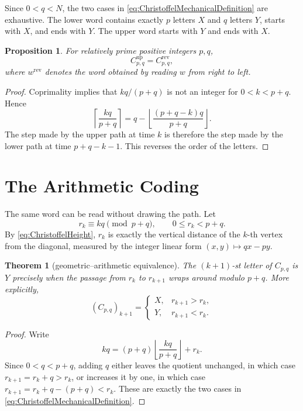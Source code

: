 \documentclass{book}
\newtheorem{proposition}[definition]{Proposition}
\newtheorem{theorem}[definition]{Theorem}
\begin{document}
Since \(0<q<N\), the two cases in
\eqref{eq:ChristoffelMechanicalDefinition} are exhaustive.  The lower
word contains exactly \(p\) letters \(X\) and \(q\) letters \(Y\), starts
with \(X\), and ends with \(Y\).  The upper word starts with \(Y\) and
ends with \(X\).

\begin{proposition}\label{proposition:ChristoffelReversal}
  For relatively prime positive integers \(p,q\),
  \[
    C^{\mathrm{up}}_{p,q}=C_{p,q}^{\mathrm{rev}},
  \]
  where \(w^{\mathrm{rev}}\) denotes the word obtained by reading \(w\)
  from right to left.
\end{proposition}
\begin{proof}
  Coprimality implies that \(kq/(p+q)\) is not an integer for
  \(0<k<p+q\).  Hence
  \[
    \left\lceil\frac{kq}{p+q}\right\rceil
    =q-\left\lfloor\frac{(p+q-k)q}{p+q}\right\rfloor.
  \]
  The step made by the upper path at time \(k\) is therefore the step made
  by the lower path at time \(p+q-k-1\).  This reverses the order of the
  letters.
\end{proof}

\section{The Arithmetic Coding}

The same word can be read without drawing the path.  Let
\[
  r_k\equiv kq\pmod{p+q},
  \qquad 0\leq r_k<p+q.
\]
By \eqref{eq:ChristoffelHeight}, \(r_k\) is exactly the vertical distance
of the \(k\)-th vertex from the diagonal, measured by the integer linear
form \((x,y)\mapsto qx-py\).

\begin{theorem}[geometric--arithmetic equivalence]
  \label{theorem:ChristoffelArithmeticCoding}
  The \((k+1)\)-st letter of \(C_{p,q}\) is \(Y\) precisely when the
  passage from \(r_k\) to \(r_{k+1}\) wraps around modulo \(p+q\).  More
  explicitly,
  \[
    (C_{p,q})_{k+1}=
    \begin{cases}
      X,&r_{k+1}>r_k,\\
      Y,&r_{k+1}<r_k.
    \end{cases}
  \]
\end{theorem}
\begin{proof}
  Write
  \[
    kq=(p+q)\left\lfloor\frac{kq}{p+q}\right\rfloor+r_k.
  \]
  Since \(0<q<p+q\), adding \(q\) either leaves the quotient unchanged,
  in which case \(r_{k+1}=r_k+q>r_k\), or increases it by one, in which
  case \(r_{k+1}=r_k+q-(p+q)<r_k\).  These are exactly the two cases in
  \eqref{eq:ChristoffelMechanicalDefinition}.
\end{proof}
\end{document}
